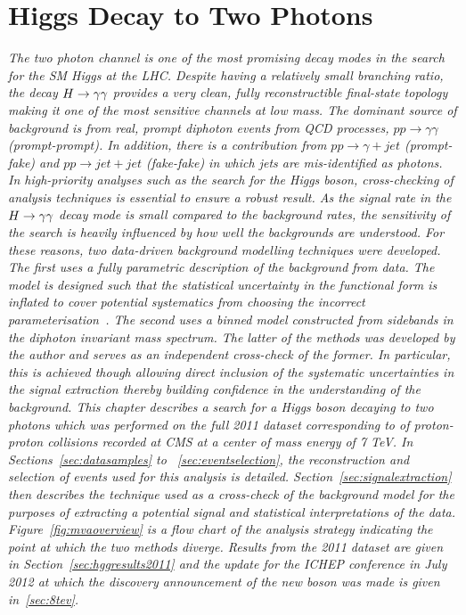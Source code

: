 \chapter{Higgs Decay to Two Photons}
\label{chap:hgg}

\emph{The two photon channel is one of the most promising decay modes in 
the search for the SM Higgs at the LHC. 
Despite having a relatively small branching ratio, the decay $H\rightarrow\gamma\gamma$ 
provides a very clean, fully reconstructible final-state topology making it 
one of the most sensitive channels at low mass.
The dominant source of background is from real, prompt diphoton events from QCD 
processes, $pp\rightarrow\gamma\gamma$ (prompt-prompt).
In addition, there is a contribution from $pp\rightarrow\gamma+jet$ (prompt-fake) and 
$pp\rightarrow jet+jet$ (fake-fake) in which jets are mis-identified as photons. 
In high-priority analyses such as the search for the Higgs boson, cross-checking of analysis
techniques is essential to ensure a robust result. 
As the signal rate in the $H\rightarrow\gamma\gamma$ decay mode is small compared to the background rates,
the sensitivity of the search is heavily influenced by how well the backgrounds are understood.
For these reasons, two data-driven background modelling techniques were developed.
The first uses a fully parametric description of the background from data.
The model is designed such that the statistical uncertainty in the functional form is inflated 
to cover potential systematics from choosing the incorrect parameterisation~\citep{HIG-11-033}. 
The second uses a binned model constructed from 
sidebands in the diphoton invariant mass spectrum. 
The latter of the methods was developed by the author and serves as an independent 
cross-check of the former. In particular, this is achieved though allowing direct 
inclusion of the systematic uncertainties in the signal extraction thereby building 
confidence in the understanding of the background. 
This chapter describes a search for a Higgs boson decaying to two photons
which was performed on the full 2011 dataset corresponding to \clumi of proton-proton collisions 
recorded at CMS at a center of mass energy of 7 TeV.
In Sections~\ref{sec:datasamples} to ~\ref{sec:eventselection}, the reconstruction and
selection of events used for this analysis is detailed. Section~\ref{sec:signalextraction} 
then describes the technique used as a cross-check of the background model for the purposes
of extracting a potential signal and statistical interpretations of the data. 
Figure~\ref{fig:mvaoverview} is a flow chart of the analysis strategy indicating the point 
at which the two methods diverge. Results from the 
2011 dataset are given in Section~\ref{sec:hggresults2011} and the update for the ICHEP conference in July 2012
at which the discovery announcement of the new boson was made is given 
in~\ref{sec:8tev}.
}

